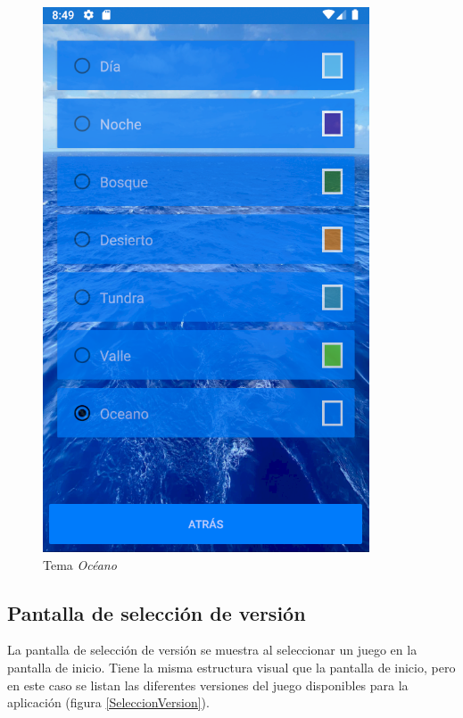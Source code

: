 \begin{figure}[H]
    \centering
    \includegraphics[scale=0.3]{Figures/Capturas/TemaOceano.png}
    \caption{Tema \textit{Océano}}
    \label{Oceano}    
\end{figure}

\subsection{Pantalla de selección de versión}
La pantalla de selección de versión se muestra al seleccionar un juego en la pantalla de inicio.
Tiene la misma estructura visual que la pantalla de inicio, pero en este caso se listan las diferentes versiones 
del juego disponibles para la aplicación (figura \ref*{SeleccionVersion}).

